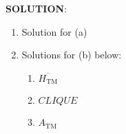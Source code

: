 \documentclass[12pt]{article}
\newcommand{\sol}{\par{\bf SOLUTION}: }
\begin{document}
\begin{enumerate}
\sol
\begin{enumerate}
	\item Solution for (a)
	\item Solutions for (b) below:
	\begin{enumerate}
		\item $\overline{H_{\text{TM}}}$
		\item $CLIQUE$
		\item $A_{\text{TM}}$
	\end{enumerate}
\end{enumerate}






\end{enumerate}
\end{document}
